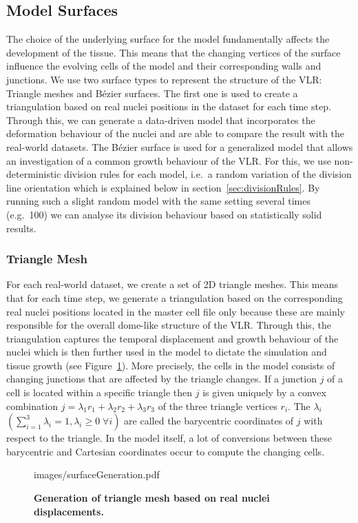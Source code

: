\documentclass[11pt,a4paper, draft]{article}
\begin{document}
\subsection{Model Surfaces}
\noindent
The choice of the underlying surface for the model fundamentally affects the development of the tissue. This means that the changing vertices of the surface influence the evolving cells of the model and their corresponding walls and junctions. We use two surface types to represent the structure of the VLR: Triangle meshes and B\'ezier surfaces. The first one is used to create a triangulation based on real nuclei positions in the dataset for each time step. Through this, we can generate a data-driven model that incorporates the deformation behaviour of the nuclei and are able to compare the result with the real-world datasets. The B\'ezier surface is used for a generalized model that allows an investigation of a common growth behaviour of the VLR. For this, we use non-deterministic division rules for each model, i.e.\ a random variation of the division line orientation which is explained below in section~\ref{sec:divisionRules}. By running such a slight random model with the same setting several times (e.g.\ 100) we can analyse its division behaviour based on statistically solid results.

\subsubsection{Triangle Mesh}
\noindent
For each real-world dataset, we create a set of 2D triangle meshes. This means that for each time step, we generate a triangulation based on the corresponding real nuclei positions located in the master cell file only because these are mainly responsible for the overall dome-like structure of the VLR. Through this, the triangulation captures the temporal displacement and growth behaviour of the nuclei which is then further used in the model to dictate the simulation and tissue growth (see Figure~\ref{fig:surfaceGeneration}). More precisely, the cells in the model consists of changing junctions that are affected by the triangle changes. If a junction $j$ of a cell is located within a specific triangle then $j$ is given uniquely by a convex combination $j = \lambda_1 r_1 + \lambda_2 r_2 + \lambda_3 r_3$ of the three triangle vertices $r_i$. The $\lambda_i$ $\left( \sum_{i=1}^{3} \lambda_i = 1, \lambda_i \geq 0 \; \forall i \right)$ are called the barycentric coordinates of $j$ with respect to the triangle. In the model itself, a lot of conversions between these barycentric and Cartesian coordinates occur to compute the changing cells.
%
\begin{figure}[htbp]
	\begin{center}
		\begin{overpic}[width=1.\linewidth]{images/surfaceGeneration.pdf}
		\end{overpic}
\caption[Generation of triangle mesh based on real nuclei displacements.]
{
{\bf Generation of triangle mesh based on real nuclei displacements.}
}
	\label{fig:surfaceGeneration}
	\end{center}
\end{figure}
%
\end{document}
